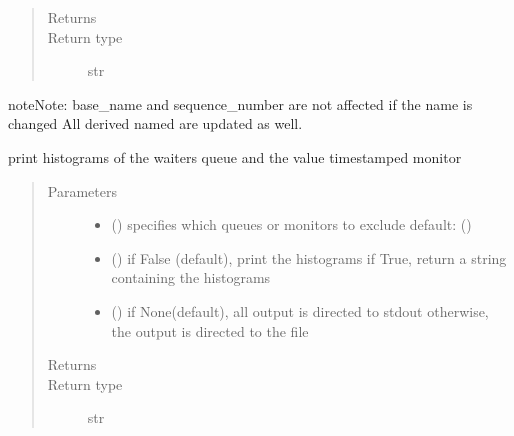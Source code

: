 \documentclass[letterpaper,10pt,english]{sphinxmanual}
\begin{document}
\begin{fulllineitems}
\begin{fulllineitems}
\begin{quote}
\begin{description}
\item[{Returns}] \leavevmode
{}

\item[{Return type}] \leavevmode
str

\end{description}\end{quote}

\begin{sphinxadmonition}{note}{Note:}
base\_name and sequence\_number are not affected if the name is changed 
All derived named are updated as well.
\end{sphinxadmonition}

\end{fulllineitems}


\begin{fulllineitems}
\label{\detokenize{Reference:salabim.State.print_histograms}}
print histograms of the waiters queue and the value timestamped monitor
\begin{quote}\begin{description}
\item[{Parameters}] \leavevmode\begin{itemize}
\item {} 
 () \textendash{} specifies which queues or monitors to exclude 
default: ()

\item {} 
 () \textendash{} if False (default), print the histograms
if True, return a string containing the histograms

\item {} 
 () \textendash{} if None(default), all output is directed to stdout 
otherwise, the output is directed to the file

\end{itemize}

\item[{Returns}] \leavevmode
{}

\item[{Return type}] \leavevmode
str


\end{description}
\end{quote}
\end{fulllineitems}
\end{fulllineitems}
\end{document}

